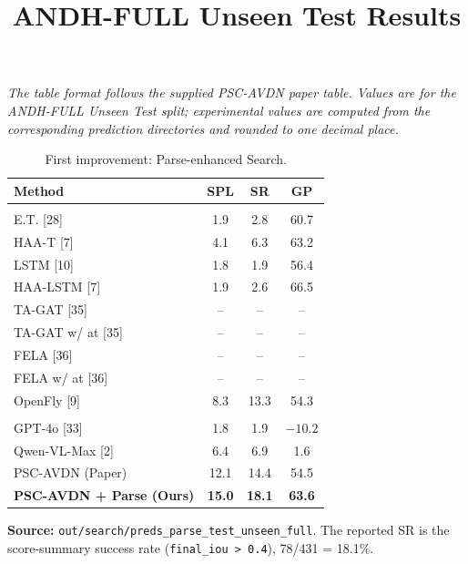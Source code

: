 \documentclass[11pt]{article}
\title{ANDH-FULL Unseen Test Results}
\author{}
\date{}
\begin{document}
\maketitle
\vspace{-1.2em}

\noindent\textit{The table format follows the supplied PSC-AVDN paper table. Values are for the ANDH-FULL Unseen Test split; experimental values are computed from the corresponding prediction directories and rounded to one decimal place.}

\begin{table}[ht]
\centering
\caption{First improvement: Parse-enhanced Search.}
\renewcommand{\arraystretch}{1.16}
\setlength{\tabcolsep}{5.5pt}
\begin{tabular}{L{5.0cm}ccc}
\toprule
\textbf{Method} & \textbf{SPL} & \textbf{SR} & \textbf{GP} \\
\midrule
{} \\
E.T. [28] & 1.9 & 2.8 & 60.7 \\
HAA-T [7] & 4.1 & 6.3 & 63.2 \\
LSTM [10] & 1.8 & 1.9 & 56.4 \\
HAA-LSTM [7] & 1.9 & 2.6 & 66.5 \\
TA-GAT [35] & -- & -- & -- \\
TA-GAT w/ at [35] & -- & -- & -- \\
FELA [36] & -- & -- & -- \\
FELA w/ at [36] & -- & -- & -- \\
OpenFly [9] & 8.3 & 13.3 & 54.3 \\
\midrule
{} \\
GPT-4o [33] & 1.8 & 1.9 & $-10.2$ \\
Qwen-VL-Max [2] & 6.4 & 6.9 & 1.6 \\
PSC-AVDN (Paper) & 12.1 & 14.4 & 54.5 \\
\textbf{PSC-AVDN + Parse (Ours)} & \textbf{15.0} & \textbf{18.1} & \textbf{63.6} \\
\bottomrule
\end{tabular}
\end{table}

\vfill
\noindent\textbf{Source:} \texttt{out/search/preds\_parse\_test\_unseen\_full}. The reported SR is the score-summary success rate (\texttt{final\_iou > 0.4}), 78/431 = 18.1\%.

\clearpage
\end{document}
